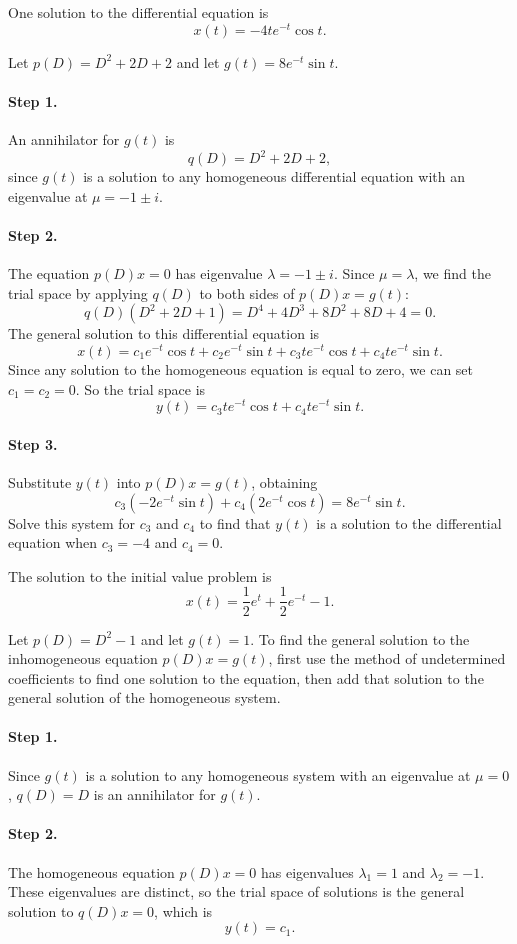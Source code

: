 \documentclass{ximera}
\begin{document}
 \ans One solution to the differential equation is
\[
x(t) = -4te^{-t}\cos t.
\]

\soln Let $p(D) = D^2 + 2D + 2$ and let $g(t) = 8e^{-t}\sin t$.
\paragraph{Step 1.} An annihilator for $g(t)$ is
\[
q(D) = D^2 + 2D + 2,
\]
since $g(t)$ is a solution to any homogeneous differential equation
with an eigenvalue at $\mu = -1 \pm i$.

\paragraph{Step 2.} The equation $p(D)x = 0$ has eigenvalue
$\lambda = -1 \pm i$.  Since $\mu = \lambda$, we find the trial space
by applying $q(D)$ to both sides of $p(D)x = g(t)$:
\[
q(D)(D^2 + 2D + 1) = D^4 + 4D^3 + 8D^2 + 8D + 4	= 0.
\]
The general solution to this differential equation is
\[
x(t) = c_1e^{-t}\cos t + c_2e^{-t}\sin t + c_3te^{-t}\cos t +
c_4te^{-t}\sin t.
\]
Since any solution to the homogeneous equation is equal to zero, we can
set $c_1 = c_2 = 0$.  So the trial space is
\[
y(t) = c_3te^{-t}\cos t + c_4te^{-t}\sin t.
\]
\paragraph{Step 3.} Substitute $y(t)$ into $p(D)x = g(t)$, obtaining
\[
c_3(-2e^{-t}\sin t) + c_4(2e^{-t}\cos t) = 8e^{-t}\sin t.
\]
Solve this system for $c_3$ and $c_4$ to find that $y(t)$ is a solution
to the differential equation when $c_3 = -4$ and $c_4 = 0$.

 \ans The solution to the initial value problem is
\[
x(t) = \frac{1}{2}e^t + \frac{1}{2}e^{-t} - 1.
\]

\soln Let $p(D) = D^2 - 1$ and let $g(t) = 1$.  To find the general solution
to the inhomogeneous equation $p(D)x = g(t)$, first use the method of
undetermined coefficients to find one solution to the equation, then
add that solution to the general solution of the homogeneous system.

\paragraph{Step 1.} Since $g(t)$ is a solution to any homogeneous system
with an eigenvalue at $\mu = 0$, $q(D) = D$ is an annihilator for
$g(t)$.

\paragraph{Step 2.} The homogeneous equation $p(D)x = 0$ has eigenvalues
$\lambda_1 = 1$ and $\lambda_2 = -1$.  These eigenvalues are distinct,
so the trial space of solutions is the general solution to $q(D)x =
0$, which is
\[
y(t) = c_1.
\]
\end{document}

